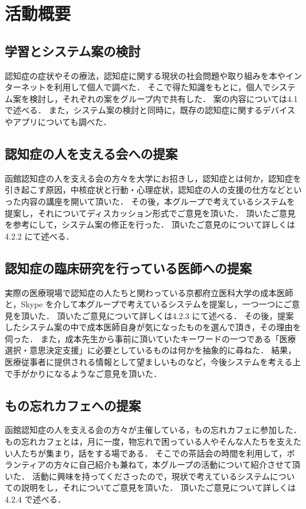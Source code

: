 \documentclass[../report]{subfiles}
\begin{document}
\section{活動概要}
\subsection{学習とシステム案の検討} \label{sec:discuss}
認知症の症状やその療法，認知症に関する現状の社会問題や取り組みを本やインターネットを利用して個人で調べた．
そこで得た知識をもとに，個人でシステム案を検討し，それぞれの案をグループ内で共有した．
案の内容については4.1 で述べる．
また，システム案の検討と同時に，既存の認知症に関するデバイスやアプリについても調べた．

\subsection{認知症の人を支える会への提案}
函館認知症の人を支える会の方々を大学にお招きし，認知症とは何か，認知症を引き起こす原因，中核症状と行動・心理症状，認知症の人の支援の仕方などといった内容の講座を開いて頂いた．
その後，本グループで考えているシステムを提案し，それについてディスカッション形式でご意見を頂いた．
頂いたご意見を参考にして，システム案の修正を行った．
頂いたご意見のについて詳しくは4.2.2 にて述べる．

\subsection{認知症の臨床研究を行っている医師への提案}
実際の医療現場で認知症の人たちと関わっている京都府立医科大学の成本医師と，Skype を介して本グループで考えているシステムを提案し，一つ一つにご意見を頂いた．
頂いたご意見について詳しくは4.2.3 にて述べる．
その後，提案したシステム案の中で成本医師自身が気になったものを選んで頂き，その理由を伺った．
また，成本先生から事前に頂いていたキーワードの一つである「医療選択・意思決定支援」に必要としているものは何かを抽象的に尋ねた．
結果，医療従事者に提供される情報として望ましいものなど，今後システムを考える上で手がかりになるようなご意見を頂いた．

\subsection{もの忘れカフェへの提案} \label{sec:propose_cafe}
函館認知症の人を支える会の方々が主催している，もの忘れカフェに参加した．
もの忘れカフェとは，月に一度，物忘れで困っている人やそんな人たちを支えたい人たちが集まり，話をする場である．
そこでの茶話会の時間を利用して，ボランティアの方々に自己紹介も兼ねて，本グループの活動について紹介させて頂いた．
活動に興味を持ってくださったので，現状で考えているシステムについての説明をし，それについてご意見を頂いた．
頂いたご意見について詳しくは4.2.4 で述べる．
\end{document}
